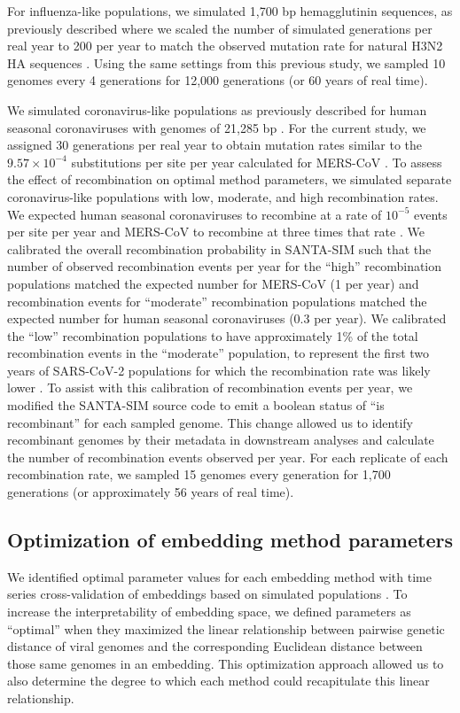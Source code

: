 \documentclass[10pt,letterpaper]{article}
\begin{document}
For influenza-like populations, we simulated 1,700 bp hemagglutinin sequences, as previously described where we scaled the number of simulated generations per real year to 200 per year to match the observed mutation rate for natural H3N2 HA sequences \cite{Huddleston2020}.
Using the same settings from this previous study, we sampled 10 genomes every 4 generations for 12,000 generations (or 60 years of real time).

We simulated coronavirus-like populations as previously described for human seasonal coronaviruses with genomes of 21,285 bp \cite{Muller2022}.
For the current study, we assigned 30 generations per real year to obtain mutation rates similar to the $9.57 \times 10^{-4}$ substitutions per site per year calculated for MERS-CoV \cite{Dudas2018}.
To assess the effect of recombination on optimal method parameters, we simulated separate coronavirus-like populations with low, moderate, and high recombination rates.
We expected human seasonal coronaviruses to recombine at a rate of $10^{-5}$ events per site per year and MERS-CoV to recombine at three times that rate \cite{Muller2022}.
We calibrated the overall recombination probability in SANTA-SIM such that the number of observed recombination events per year for the ``high'' recombination populations matched the expected number for MERS-CoV (1 per year) and recombination events for ``moderate'' recombination populations matched the expected number for human seasonal coronaviruses (0.3 per year).
We calibrated the ``low'' recombination populations to have approximately 1\% of the total recombination events in the ``moderate'' population, to represent the first two years of SARS-CoV-2 populations for which the recombination rate was likely lower \cite{Carabelli2023}.
To assist with this calibration of recombination events per year, we modified the SANTA-SIM source code to emit a boolean status of ``is recombinant'' for each sampled genome.
This change allowed us to identify recombinant genomes by their metadata in downstream analyses and calculate the number of recombination events observed per year.
For each replicate of each recombination rate, we sampled 15 genomes every generation for 1,700 generations (or approximately 56 years of real time).

\subsection*{Optimization of embedding method parameters}

We identified optimal parameter values for each embedding method with time series cross-validation of embeddings based on simulated populations \cite{HyndmanAthanasopoulos2021}.
To increase the interpretability of embedding space, we defined parameters as ``optimal'' when they maximized the linear relationship between pairwise genetic distance of viral genomes and the corresponding Euclidean distance between those same genomes in an embedding.
This optimization approach allowed us to also determine the degree to which each method could recapitulate this linear relationship.
\end{document}
